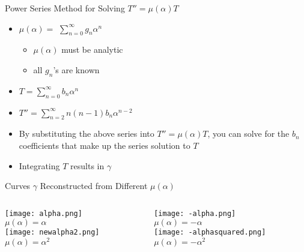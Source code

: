 \documentclass[]{beamer}
\begin{document}
\begin{frame}{Power Series Method for Solving $T'' = \mu(\alpha) T$}
\begin{itemize}
    \item $\mu(\alpha)=$ $\sum\limits_{n=0}^{\infty}  g_n\alpha^n$  
    \begin{itemize}
        \item $\mu(\alpha)$ must be analytic
        \item all  $g_n$'s are known
    \end{itemize}
    \item $T= \sum\limits_{n=0}^{\infty}  b_n\alpha^n$ 
    \item $T''= \sum\limits_{n=2}^{\infty} n (n-1) b_n \alpha^{n-2}$
    \item By substituting the above series into $T'' = \mu(\alpha)T$, you can solve for the $b_n$ coefficients that make up the series solution to $T$  
    \item Integrating $T$ results in $\gamma$
\end{itemize}
\end{frame}


\begin{frame}{Curves $\gamma$ Reconstructed from Different $\mu(\alpha)$ }
\begin{columns}

\begin{column}{0.5\textwidth}
\begin{center}
\texttt{[image: alpha.png]}\\{$\mu(\alpha) = \alpha$}\\
\texttt{[image: newalpha2.png]}\\{$\mu(\alpha) = \alpha ^2$}\\
\end{center}
\end{column}

\begin{column}{0.5\textwidth}
\begin{center}
\texttt{[image: -alpha.png]}\\{$\mu(\alpha) = - \alpha$   }\\
\texttt{[image: -alphasquared.png]}\\{$\mu(\alpha) = - \alpha ^2$}\\
\end{center}
\end{column}
\end{columns}
\end{frame}
\end{document}
